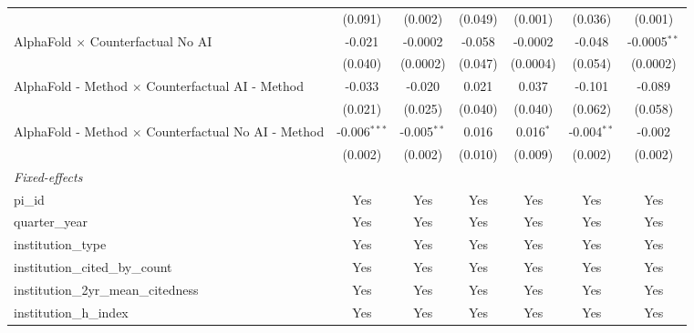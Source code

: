 \begin{tabular}{lcccccc}
                                                               & (0.091)        & (0.002)       & (0.049)       & (0.001)       & (0.036)       & (0.001)\\   
   AlphaFold $\times$ Counterfactual No AI                     & -0.021         & -0.0002       & -0.058        & -0.0002       & -0.048        & -0.0005$^{**}$\\   
                                                               & (0.040)        & (0.0002)      & (0.047)       & (0.0004)      & (0.054)       & (0.0002)\\   
   AlphaFold - Method $\times$ Counterfactual AI - Method      & -0.033         & -0.020        & 0.021         & 0.037         & -0.101        & -0.089\\   
                                                               & (0.021)        & (0.025)       & (0.040)       & (0.040)       & (0.062)       & (0.058)\\   
   AlphaFold - Method $\times$ Counterfactual No AI - Method   & -0.006$^{***}$ & -0.005$^{**}$ & 0.016         & 0.016$^{*}$   & -0.004$^{**}$ & -0.002\\   
                                                               & (0.002)        & (0.002)       & (0.010)       & (0.009)       & (0.002)       & (0.002)\\   
   \midrule
   \emph{Fixed-effects}\\
   pi\_id                                                      & Yes            & Yes           & Yes           & Yes           & Yes           & Yes\\  
   quarter\_year                                               & Yes            & Yes           & Yes           & Yes           & Yes           & Yes\\  
   institution\_type                                           & Yes            & Yes           & Yes           & Yes           & Yes           & Yes\\  
   institution\_cited\_by\_count                               & Yes            & Yes           & Yes           & Yes           & Yes           & Yes\\  
   institution\_2yr\_mean\_citedness                           & Yes            & Yes           & Yes           & Yes           & Yes           & Yes\\  
   institution\_h\_index                                       & Yes            & Yes           & Yes           & Yes           & Yes           & Yes\\  

\end{tabular}
